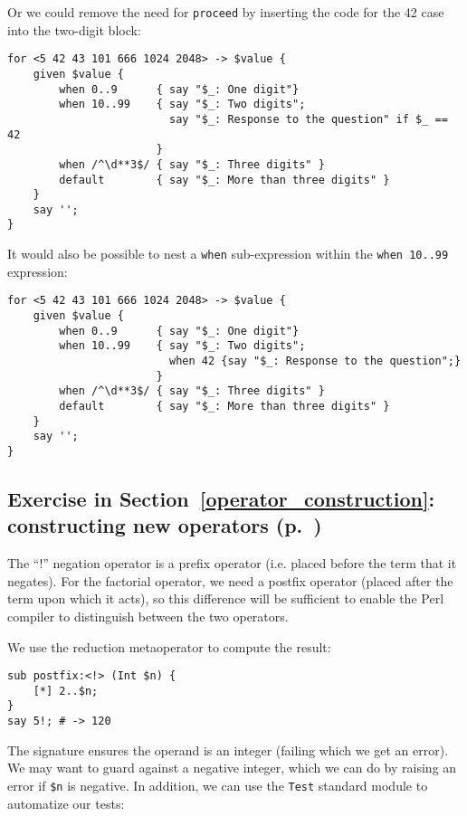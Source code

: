 Or we could remove the need for {\tt proceed} by inserting 
the code for the 42 case into the two-digit block: 

\begin{verbatim}
for <5 42 43 101 666 1024 2048> -> $value {
    given $value {
        when 0..9      { say "$_: One digit"}
        when 10..99    { say "$_: Two digits"; 
                         say "$_: Response to the question" if $_ == 42
                       }
        when /^\d**3$/ { say "$_: Three digits" }
        default        { say "$_: More than three digits" }
    }
    say '';
}
\end{verbatim}

It would also be possible to nest a \verb'when' sub-expression 
within the \verb'when 10..99' expression:

\begin{verbatim}
for <5 42 43 101 666 1024 2048> -> $value {
    given $value {
        when 0..9      { say "$_: One digit"}
        when 10..99    { say "$_: Two digits"; 
                         when 42 {say "$_: Response to the question";}
                       }
        when /^\d**3$/ { say "$_: Three digits" }
        default        { say "$_: More than three digits" }
    }
    say '';
}
\end{verbatim}

\subsection{Exercise in Section~\ref{operator_construction}: constructing new operators (p.~\pageref{fact_operator})}
\label{sol_fact_operator}

The ``!'' negation operator is a prefix operator (i.e. placed 
before the term that it negates). For the factorial operator, 
we need a postfix operator (placed after the term upon which it 
acts), so this difference will be sufficient to enable the 
Perl compiler to distinguish between the two operators.

We use the reduction metaoperator to compute the result:

\begin{verbatim}
sub postfix:<!> (Int $n) {
    [*] 2..$n;
}
say 5!; # -> 120
\end{verbatim}


The signature ensures the operand is an integer (failing which 
we get an error). We may want to guard against a 
negative integer, which we can do by raising an error if 
\verb'$n' is negative. In addition, we can use the {\tt Test} 
standard module to automatize our tests:

